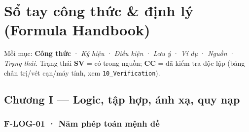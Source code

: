 \documentclass[
  10pt,
  twoside,openany]{book}
\begin{document}
\hypertarget{formulas}{%
\chapter{Sổ tay công thức \& định lý (Formula
Handbook)}\label{formulas}}

Mỗi mục: \textbf{Công thức} · \emph{Ký hiệu} · \emph{Điều kiện} ·
\emph{Lưu ý} · \emph{Ví dụ} · \emph{Nguồn} · \emph{Trạng thái}. Trạng
thái \textbf{SV} = có trong nguồn; \textbf{CC} = đã kiểm tra độc lập
(bảng chân trị/vét cạn/máy tính, xem \texttt{10\_Verification}).

\hypertarget{chux1b0ux1a1ng-i-logic-tux1eadp-hux1ee3p-uxe1nh-xux1ea1-quy-nux1ea1p}{%
\section{Chương I --- Logic, tập hợp, ánh xạ, quy
nạp}\label{chux1b0ux1a1ng-i-logic-tux1eadp-hux1ee3p-uxe1nh-xux1ea1-quy-nux1ea1p}}

\hypertarget{F-LOG-01}{%
\subsection{F-LOG-01 · Năm phép toán mệnh đề}\label{F-LOG-01}}
\end{document}
